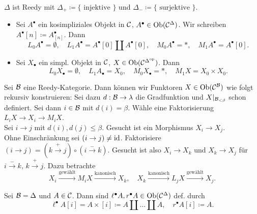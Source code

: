 \documentclass{cheat-sheet}
\begin{document}
\begin{bsp}
  $\Delta$ ist Reedy mit $\Delta_{+} \coloneqq \{\text{ injektive }\}$ und $\Delta_{-} \coloneqq \{\text{ surjektive }\}$.
\end{bsp}

\begin{bspe}
  \begin{itemize}
    \item Sei $A^\bullet$ ein kosimpliziales Objekt in $\mathcal{C}$, \dh{} $A^\bullet \in \operatorname{Ob}(\mathcal{C}^\Delta)$.
    Wir schreiben $A^\bullet [n] \coloneqq A^\bullet_{[n]}$. Dann
    \[
      L_0 A^\bullet \!=\! \emptyset, \quad
      L_1 A^\bullet \!=\! A^\bullet[0] \amalg A^\bullet [0], \quad
      M_0 A^\bullet \!=\! *, \quad
      M_1 A^\bullet \!=\! A^\bullet [0].
    \]
    \item Sei $X_\bullet$ ein simpl. Objekt in $\mathcal{C}$, \dh{} $X \in \operatorname{Ob}(\mathcal{C}^{\Delta^{\mathrm{op}}})$. Dann
    \[
      L_0 X_\bullet = \emptyset, \quad
      L_1 A_\bullet = X_0, \quad
      M_0 X_\bullet = *, \quad
      M_1 X = X_0 \times X_0.
    \]
  \end{itemize}
\end{bspe}

\begin{bem}
  Sei $\mathcal{B}$ eine Reedy-Kategorie.
  Dann können wir Funktoren $X \in \operatorname{Ob}(\mathcal{C}^{\mathcal{B}})$ wie folgt rekursiv konstruieren:
  Sei dazu $d : \mathcal{B} \to \lambda$ die Gradfunktion und $X|_{\mathcal{B}_{< \beta}}$ schon definiert.
  Sei dann $i \in \mathcal{B}$ mit $d(i) = \beta$.
  Wähle eine Faktorisierung $L_i X \to X_i \to M_i X$. \\
  Sei $i \to j$ mit $d(i), d(j) \leq \beta$.
  Gesucht ist ein Morphismus $X_i \to X_j$. \\
  Ohne Einschränkung sei $(i \to j) \neq \operatorname{id}$.
  Faktorisiere $(i \to j) = (k \xrightarrow{{+}} j) \circ (i \xrightarrow{{-}} k)$.
  Gesucht ist also $X_i \to X_k$ und $X_k \to X_j$ für $i \xrightarrow{{-}} k$, $k \xrightarrow{{+}} j$.
  Dazu betrachte
  \[
    X_i \xrightarrow{\text{gewählt}} M_i X \xrightarrow{\text{kanonisch}} X_k, \quad
    X_k \xrightarrow{\text{kanonisch}} L_j X \xrightarrow{\text{gewählt}} X_j.
  \]
\end{bem}

\iffalse
\begin{bsp}
  Sei $\Bat = \Delta$ und $A \in \Cat$. Ziel: Konstruktion $X^\bullet \in \Cat^{\Delta}$.
\end{bsp}
\fi

\begin{defn}
  Sei $\Bat = \Delta$ und $A \in \Cat$.
  Dann sind $\ell^\bullet A, r^\bullet A \in \operatorname{Ob}(\mathcal{C}^\Delta)$ def. durch
  \[
    \ell^\bullet A [i] = A \times [i] \coloneqq A \amalg \ldots \amalg A, \quad
    r^\bullet A [i] \coloneqq A.
  \]
\end{defn}
\end{document}
